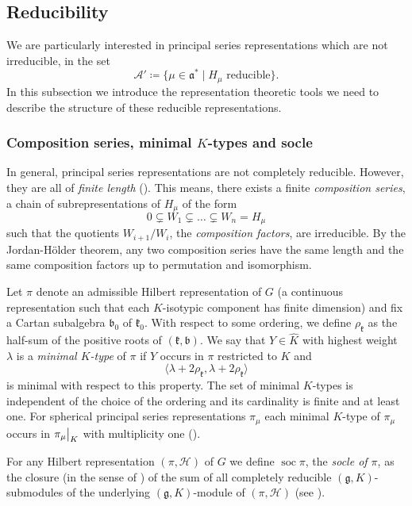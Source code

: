 \documentclass[JEP,XML,SOM,NoFloatCountersInSection,Unicode,published]{cedram}
\theoremstyle{definition}
\newcommand\restr[2]{{
\left.\kern-\nulldelimiterspace
#1
\vphantom{\big|}
\right|_{#2}
}}
\newcommand{\mc}[1]{\ensuremath{\mathcal{#1}}}
\newcommand{\mf}[1]{\ensuremath{\mathfrak{#1}}}
\newcommand{\on}[1]{\ensuremath{\operatorname{#1}}}
\newcommand{\ps}[2]{\ensuremath{H_{#2}}}
\begin{document}
\subsection{Reducibility}\label{subsec:red}
We are particularly interested in principal series representations which are not irreducible, \ie in the set
\[
\mc A'\coloneqq\{\mu\in\mf a^*\mid\ps{\sigma}{\mu}\text{ reducible}\}.
\]
In this subsection we introduce the representation theoretic tools we need to describe the structure of these reducible representations.
\subsubsection*{Composition series, minimal \texorpdfstring{$K$}{K}-types and socle}
In general, principal series representations are not completely reducible. However, they are all of \emph{finite length} (\cf \cite{Kra78}). This means, there exists a finite \emph{composition series}, \ie a chain of subrepresentations of $\ps{\sigma}{\mu}$ of the form
\[
0\subsetneq W_1\subsetneq\ldots\subsetneq W_n=\ps{\sigma}{\mu}
\]
such that the quotients $W_{i+1}/W_i$, the \emph{composition factors}, are irreducible. By the Jordan-Hölder theorem, any two composition series have the same length and the same composition factors up to permutation and isomorphism.

Let $\pi$ denote an admissible Hilbert representation of $G$ (\ie a continuous representation such that each $K$-isotypic component has finite dimension) and fix a Cartan subalgebra $\mf b_0$ of $\mf k_0$. With respect to some ordering, we define $\rho_{\mf k}$ as the half-sum of the positive roots of $(\mf k,\mf b)$. We say that $Y\in\hat K$ with highest weight $\lambda$ is a \emph{minimal $K$-type} of $\pi$ if $Y$ occurs in $\pi$ restricted to $K$ and
\[
\langle\lambda+2\rho_{\mf k},\lambda+2\rho_{\mf k}\rangle
\]
is minimal with respect to this property. The set of minimal $K$-types is independent of the choice of the ordering and its cardinality is finite and at least one. For spherical principal series representations $\pi_{\mu}$ each minimal $K$-type of $\pi_{\mu}$ occurs in $\restr{\pi_{\mu}}{K}$ with multiplicity one (\cf \cite[Th.\,1.1]{Vo79}).

For any Hilbert representation $(\pi,\mc H)$ of $G$ we define $\on{soc}\pi$, the \emph{socle of $\pi$}, as the closure (in the sense of \cite[Th.\,8.9]{Kna86}) of the sum of all completely reducible $(\mf g,K)$-submodules of the underlying $(\mf g,K)$-module of $(\pi,\mc H)$ (see \cite[p.\,538]{cohomo}).
\end{document}

